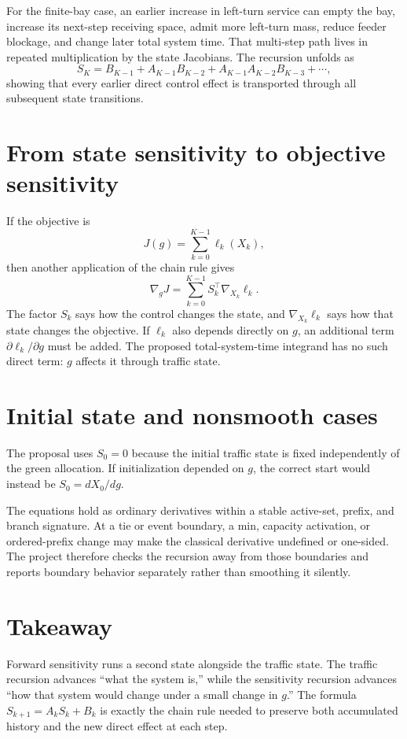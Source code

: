 \documentclass[10pt]{article}
\begin{document}
For the finite-bay case, an earlier increase in left-turn service can empty the bay, increase its next-step receiving space, admit more left-turn mass, reduce feeder blockage, and change later total system time. That multi-step path lives in repeated multiplication by the state Jacobians. The recursion unfolds as
\[
  S_K=B_{K-1}+A_{K-1}B_{K-2}+A_{K-1}A_{K-2}B_{K-3}+\cdots,
\]
showing that every earlier direct control effect is transported through all subsequent state transitions.

\section{From state sensitivity to objective sensitivity}
If the objective is
\[
  J(g)=\sum_{k=0}^{K-1}\ell_k(X_k),
\]
then another application of the chain rule gives
\[
  \nabla_gJ
  =\sum_{k=0}^{K-1}S_k^\top\nabla_{X_k}\ell_k.
\]
The factor $S_k$ says how the control changes the state, and $\nabla_{X_k}\ell_k$ says how that state changes the objective. If $\ell_k$ also depends directly on $g$, an additional term $\partial\ell_k/\partial g$ must be added. The proposed total-system-time integrand has no such direct term: $g$ affects it through traffic state.

\section{Initial state and nonsmooth cases}
The proposal uses $S_0=0$ because the initial traffic state is fixed independently of the green allocation. If initialization depended on $g$, the correct start would instead be $S_0=dX_0/dg$.

The equations hold as ordinary derivatives within a stable active-set, prefix, and branch signature. At a tie or event boundary, a min, capacity activation, or ordered-prefix change may make the classical derivative undefined or one-sided. The project therefore checks the recursion away from those boundaries and reports boundary behavior separately rather than smoothing it silently.

\section*{Takeaway}
Forward sensitivity runs a second state alongside the traffic state. The traffic recursion advances ``what the system is,'' while the sensitivity recursion advances ``how that system would change under a small change in $g$.'' The formula $S_{k+1}=A_kS_k+B_k$ is exactly the chain rule needed to preserve both accumulated history and the new direct effect at each step.
\end{document}
